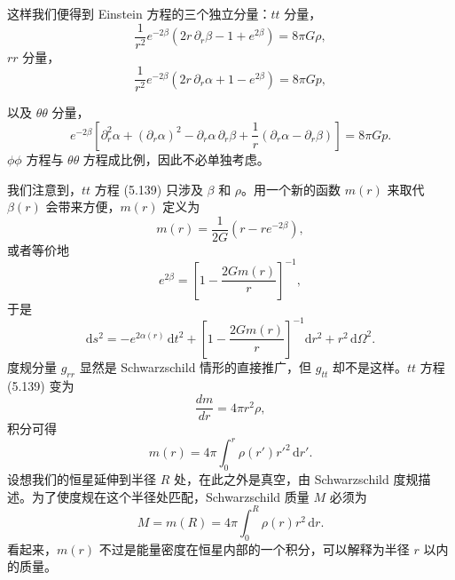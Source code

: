 这样我们便得到 Einstein 方程的三个独立分量：$tt$ 分量，
\begin{equation*}
\frac{1}{r^2}e^{-2\beta}\left(2r\,\partial_r\beta - 1 + e^{2\beta}\right) = 8\pi G\rho,
\tag{5.139}
\end{equation*}
$rr$ 分量，
\begin{equation*}
\frac{1}{r^2}e^{-2\beta}\left(2r\,\partial_r\alpha + 1 - e^{2\beta}\right) = 8\pi Gp,
\tag{5.140}
\end{equation*}

以及 $\theta\theta$ 分量，
\begin{equation*}
e^{-2\beta}\left[\partial_r^2\alpha + (\partial_r\alpha)^2 - \partial_r\alpha\,\partial_r\beta + \frac{1}{r}(\partial_r\alpha - \partial_r\beta)\right] = 8\pi Gp.
\tag{5.141}
\end{equation*}
$\phi\phi$ 方程与 $\theta\theta$ 方程成比例，因此不必单独考虑。

我们注意到，$tt$ 方程 (5.139) 只涉及 $\beta$ 和 $\rho$。用一个新的函数 $m(r)$ 来取代 $\beta(r)$ 会带来方便，$m(r)$ 定义为
\begin{equation*}
m(r) = \frac{1}{2G}\left(r - re^{-2\beta}\right),
\tag{5.142}
\end{equation*}
或者等价地
\begin{equation*}
e^{2\beta} = \left[1 - \frac{2Gm(r)}{r}\right]^{-1},
\tag{5.143}
\end{equation*}
于是
\begin{equation*}
\mathrm{d}s^2 = -e^{2\alpha(r)}\,\mathrm{d}t^2 + \left[1 - \frac{2Gm(r)}{r}\right]^{-1}\mathrm{d}r^2 + r^2\,\mathrm{d}\Omega^2.
\tag{5.144}
\end{equation*}
度规分量 $g_{rr}$ 显然是 Schwarzschild 情形的直接推广，但 $g_{tt}$ 却不是这样。$tt$ 方程 (5.139) 变为
\begin{equation*}
\frac{dm}{dr} = 4\pi r^2\rho,
\tag{5.145}
\end{equation*}
积分可得
\begin{equation*}
m(r) = 4\pi\int_0^r \rho(r')r'^2\,\mathrm{d}r'.
\tag{5.146}
\end{equation*}
设想我们的恒星延伸到半径 $R$ 处，在此之外是真空，由 Schwarzschild 度规描述。为了使度规在这个半径处匹配，Schwarzschild 质量 $M$ 必须为
\begin{equation*}
M = m(R) = 4\pi\int_0^R \rho(r)r^2\,\mathrm{d}r.
\tag{5.147}
\end{equation*}
看起来，$m(r)$ 不过是能量密度在恒星内部的一个积分，可以解释为半径 $r$ 以内的质量。

